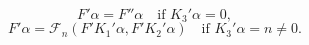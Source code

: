 $$F' \alpha = F'' \alpha \quad \text{if } K_3' \alpha = 0,$$
$$F' \alpha = \mathcal{F}_n(F'K_1' \alpha, F'K_2' \alpha) \quad \text{if } K_3' \alpha = n \neq 0.$$
